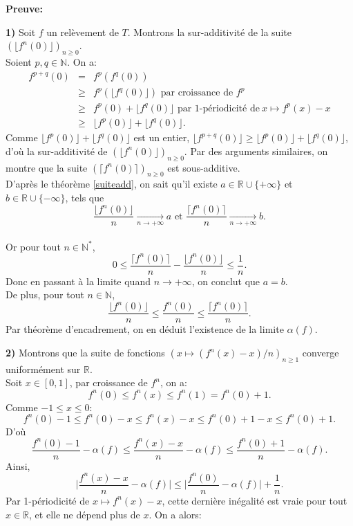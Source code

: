 \textbf{Preuve:}
	\par \textbf{1) }Soit $f$ un relèvement de $T$. Montrons la sur-additivité de la suite $(\lfloor f^n(0) \rfloor)_{n \geq 0}$.\\
	Soient $p,q \in \mathbb{N}$. On a:
		\begin{eqnarray*}
			f^{p+q}(0)&=&f^p(f^q(0))\\
			& \geq &  f^p(\lfloor f^q(0) \rfloor ) \text{ par croissance de }f^p\\
			& \geq &  f^p(0) +\lfloor f^q(0) \rfloor \text{ par 1-périodicité de}\ x \mapsto f^p(x)-x\\
			& \geq &  \lfloor f^p(0) \rfloor +\lfloor f^q(0) \rfloor.
		\end{eqnarray*}
	Comme $\lfloor f^p(0) \rfloor +\lfloor f^q(0) \rfloor$ est un entier, $\lfloor f^{p+q}(0) \rfloor \geq \lfloor f^p(0) \rfloor +\lfloor f^q(0) \rfloor$, d'où la sur-additivité de  $(\lfloor f^n(0) \rfloor)_{n \geq 0}$. Par des arguments similaires, on montre que la suite $( \lceil f^n(0) \rceil )_{n \geq 0}$ est sous-additive.
	\\
	D'après le théorème \ref{suiteadd}, on sait qu'il existe $a \in \mathbb{R} \cup \lbrace + \infty \rbrace$ et $b \in \mathbb{R} \cup \lbrace - \infty \rbrace$, tels que
	$$\frac{\lfloor f^n(0) \rfloor }{n} \underset{n \to + \infty}{\longrightarrow} a \text{ et }\frac{\lceil f^n(0) \rceil }{n} \underset{n \to + \infty}{\longrightarrow} b.$$
	\\
	Or pour tout $n\in \mathbb{N}^*$, $$0 \leq \frac{\lceil f^n(0) \rceil }{n} - \frac{\lfloor f^n(0) \rfloor }{n} \leq \frac{1}{n}. $$
	Donc en passant à la limite quand $n \to + \infty$, on conclut que $a=b$.
	\\
	De plus, pour tout $n \in \mathbb{N}$, $$\frac{\lfloor f^n(0) \rfloor}{n} \leq \frac{ f^n(0)  }{n} \leq \frac{\lceil f^n(0) \rceil}{n}.$$ Par théorème d'encadrement, on en déduit l'existence de la limite $\alpha(f)$.
	\\
	\par\textbf{2) }Montrons que la suite de fonctions $(x\mapsto (f^n(x)-x)/n)_{n\geq1}$ converge uniformément sur $\mathbb{R}$.
	\\
	Soit $x \in [0,1]$, par croissance de $f^n$, on a:
	$$f^n(0) \leq f^n(x) \leq f^n(1)=f^n(0)+1.$$
	Comme $-1\leq x \leq 0$:
	$$f^n(0)-1\leq f^n(0) - x \leq f^n(x)-x \leq f^n(0)+1 -x \leq  f^n(0)+1 .$$
	D'où
	$$\frac{f^n(0)-1}{n} - \alpha(f) \leq \frac{f^n(x)-x}{n} - \alpha(f) \leq \frac{f^n(0)+1}{n} - \alpha(f).$$
	Ainsi,
	$$\Big|\frac{f^n(x)-x}{n}-\alpha(f)\Big|\leq \Big|\frac{f^n(0)}{n}-\alpha(f)\Big| + \frac{1}{n}.$$
	Par 1-périodicité de $x\mapsto f^n(x)-x$, cette dernière inégalité est vraie pour tout $x \in \mathbb{R}$, et elle ne dépend plus de $x$. On a alors:

